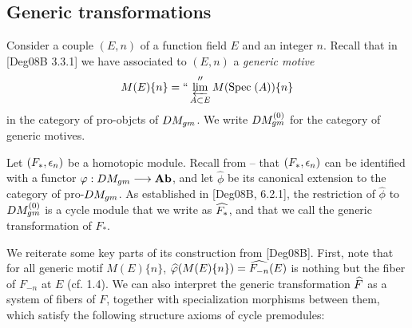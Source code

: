\subsection{Generic transformations} Consider a couple $(E, n)$
of a function field $E$ and an integer $n$. Recall that in 
[Deg08B 3.3.1] we have associated to $(E, n)$ a \emph{generic 
motive}
\[
M(E)\{n\} = ``\varprojlim_{A \subset E}'' M(\mathrm{Spec}\;(A))\{n\}
\]
in the category of pro-objcts of $DM_{gm}$. We write 
$DM_{gm}^{(0)}$ for the category of generic motives.

Let $(F_*, \epsilon_n)$ be a homotopic module. Recall from -- that
$(F_*, \epsilon_n)$ can be identified with a functor $\varphi: DM_{gm}
\longrightarrow \mathbf{Ab}$, and let $\widehat{\phi}$ be its canonical extension to
the category of pro-$DM_{gm}$. As established in [Deg08B, 6.2.1],
the restriction of $\widehat{\phi}$ to $DM_{gm}^{(0)}$ is a cycle module
that we write as $\widehat{F_*}$, and that we call the generic
transformation of $F_*$.

We reiterate some key parts of its construction from [Deg08B]. 
First, note that for all generic motif $M(E)\{n\}$, 
$\widehat{\varphi}(M(E)\{n\}) = \widehat{F_{-n}}(E)$ is nothing
but the fiber of $F_{-n}$ at $E$ (cf. 1.4). We can also interpret
the generic transformation $\widehat{F}$ as a system of fibers 
of $F$, together with specialization morphisms between them,
which satisfy the following structure axioms of cycle premodules:

